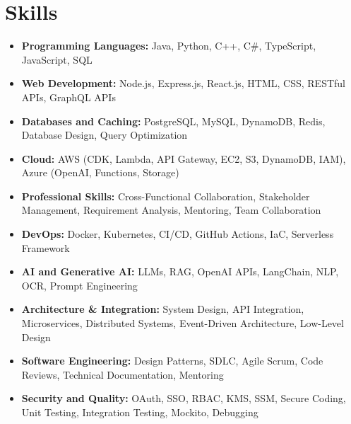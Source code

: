 \documentclass[10pt]{article}
\newcommand{\skillItem}[2]{\item \textbf{#1:} #2}
\begin{document}
\section{Skills}
\begin{minipage}[t]{0.49\textwidth}
\footnotesize
\begin{itemize}[leftmargin=12pt, itemsep=0.4pt, topsep=0.5pt, parsep=0pt]
  \skillItem{Programming Languages}{Java, Python, C++, C\#, TypeScript, JavaScript, SQL}
  \skillItem{Web Development}{Node.js, Express.js, React.js, HTML, CSS, RESTful APIs, GraphQL APIs}
  \skillItem{Databases and Caching}{PostgreSQL, MySQL, DynamoDB, Redis, Database Design, Query Optimization}
  \skillItem{Cloud}{AWS (CDK, Lambda, API Gateway, EC2, S3, DynamoDB, IAM), Azure (OpenAI, Functions, Storage)}
  \skillItem{Professional Skills}{Cross-Functional Collaboration, Stakeholder Management, Requirement Analysis, Mentoring, Team Collaboration}
\end{itemize}
\end{minipage}
\hfill
\begin{minipage}[t]{0.49\textwidth}
\footnotesize
\begin{itemize}[leftmargin=12pt, itemsep=0.4pt, topsep=0.5pt, parsep=0pt]
  \skillItem{DevOps}{Docker, Kubernetes, CI/CD, GitHub Actions, IaC, Serverless Framework}
  \skillItem{AI and Generative AI}{LLMs, RAG, OpenAI APIs, LangChain, NLP, OCR, Prompt Engineering}
  \skillItem{Architecture \& Integration}{System Design, API Integration, Microservices, Distributed Systems, Event-Driven Architecture, Low-Level Design}
  \skillItem{Software Engineering}{Design Patterns, SDLC, Agile Scrum, Code Reviews, Technical Documentation, Mentoring}
  \skillItem{Security and Quality}{OAuth, SSO, RBAC, KMS, SSM, Secure Coding, Unit Testing, Integration Testing, Mockito, Debugging}
\end{itemize}
\end{minipage}
\vspace{-2pt}
\end{document}
